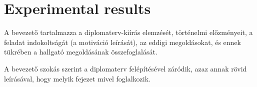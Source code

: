 \chapter{Experimental results}
\label{chap:experimental}

A bevezető tartalmazza a diplomaterv-kiírás elemzését, történelmi előzményeit, 
a feladat indokoltságát (a motiváció leírását), az eddigi megoldásokat, 
és ennek tükrében a hallgató megoldásának összefoglalását.

A bevezető szokás szerint a diplomaterv felépítésével záródik, 
azaz annak rövid leírásával, hogy melyik fejezet mivel foglalkozik.
